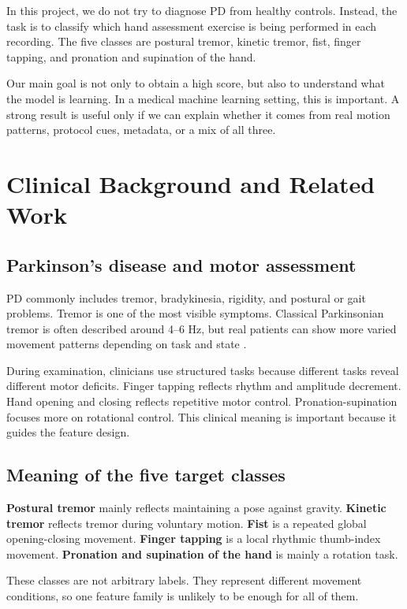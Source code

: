 \documentclass[10pt,twocolumn]{article}
\begin{document}
In this project, we do not try to diagnose PD from healthy controls. Instead, the task is to classify which hand assessment exercise is being performed in each recording. The five classes are postural tremor, kinetic tremor, fist, finger tapping, and pronation and supination of the hand.

Our main goal is not only to obtain a high score, but also to understand what the model is learning. In a medical machine learning setting, this is important. A strong result is useful only if we can explain whether it comes from real motion patterns, protocol cues, metadata, or a mix of all three.

\section{Clinical Background and Related Work}
\subsection{Parkinson's disease and motor assessment}
PD commonly includes tremor, bradykinesia, rigidity, and postural or gait problems. Tremor is one of the most visible symptoms. Classical Parkinsonian tremor is often described around 4--6 Hz, but real patients can show more varied movement patterns depending on task and state \citep{shahed2007,saifee2019}.

During examination, clinicians use structured tasks because different tasks reveal different motor deficits. Finger tapping reflects rhythm and amplitude decrement. Hand opening and closing reflects repetitive motor control. Pronation-supination focuses more on rotational control. This clinical meaning is important because it guides the feature design.

\subsection{Meaning of the five target classes}
\textbf{Postural tremor} mainly reflects maintaining a pose against gravity. \textbf{Kinetic tremor} reflects tremor during voluntary motion. \textbf{Fist} is a repeated global opening-closing movement. \textbf{Finger tapping} is a local rhythmic thumb-index movement. \textbf{Pronation and supination of the hand} is mainly a rotation task.

These classes are not arbitrary labels. They represent different movement conditions, so one feature family is unlikely to be enough for all of them.
\end{document}
